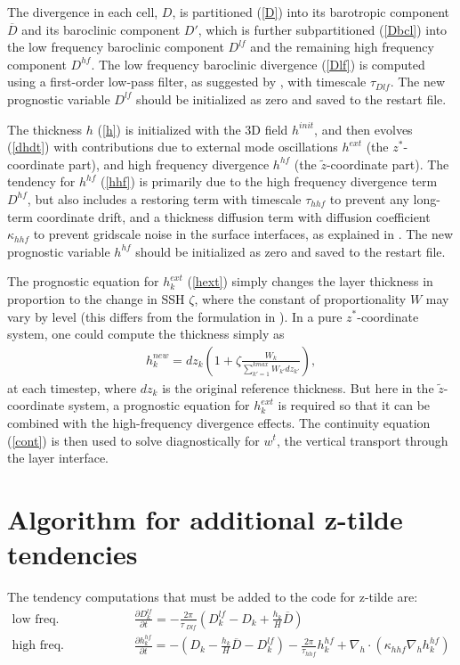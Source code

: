 \documentclass[11pt]{report}
\newcommand{\bea}{\begin{eqnarray}}
\newcommand{\eea}{\end{eqnarray}}
\begin{document}
The divergence in each cell, $D$, is partitioned (\ref{D}) into its barotropic component ${\overline D}$ and its baroclinic component $D'$, which is further subpartitioned (\ref{Dbcl}) into the low frequency baroclinic component $D^{lf}$ and the remaining high frequency component $D^{hf}$.  The low frequency baroclinic divergence (\ref{Dlf}) is computed using a first-order low-pass filter, as suggested by \citep{Leclair_Madec11om}, with timescale $\tau_{Dlf}$.  The new prognostic variable $D^{lf}$ should be initialized as zero and saved to the restart file.

The thickness $h$ (\ref{h}) is initialized with the 3D field $h^{init}$, and then evolves (\ref{dhdt}) with contributions due to external mode oscillations $h^{ext}$ (the $z^*$-coordinate part), and high frequency divergence $h^{hf}$ (the ${\tilde z}$-coordinate part).  The tendency for $h^{hf}$ (\ref{hhf}) is primarily due to the high frequency divergence term $D^{hf}$, but also includes a restoring term with timescale $\tau_{hhf}$ to prevent any long-term coordinate drift, and a thickness diffusion term with diffusion coefficient $\kappa_{hhf}$ to prevent gridscale noise in the surface interfaces, as explained in \citet{Leclair_Madec11om}.  The new prognostic variable $h^{hf}$ should be initialized as zero and saved to the restart file.

The prognostic equation for $h^{ext}_k$ (\ref{hext}) simply changes the layer thickness in proportion to the change in SSH $\zeta$, where the constant of proportionality $W$ may vary by level (this differs from the formulation in \citet{Leclair_Madec11om}).  In a pure $z^*$-coordinate system, one could compute the thickness simply as
\bea
   h_k^{new} = dz_k\left( 1+ \zeta \frac{W_k}{\sum_{k'=1}^{kmax}W_{k'}{dz}_{k'}}\right),
\eea
at each timestep, where $dz_k$ is the original reference thickness.  But here in the ${\tilde z}$-coordinate system, a prognostic equation for $h^{ext}_k$ is required so that it can be combined with the high-frequency divergence effects.
The continuity equation (\ref{cont}) is then used to solve diagnostically for $w^t$, the vertical transport through the layer interface.

\section{Algorithm for additional z-tilde tendencies \label{s tend alg}}

The tendency computations that must be added to the code for z-tilde are:
\bea 
\mbox{low freq. baroclinic div.} && 
  \frac{\partial D^{lf}_k}{\partial t} 
= - \frac{2\pi}{\tau_{\;Dlf}} \left( D^{lf}_k - D_k + \frac{h_k}{H}{\overline D} \right) \label{Dlf2}\\
\mbox{high freq. thickness tend.} && 
  \frac{\partial h^{hf}_k}{\partial t} = - (D_k-{\frac{h_k}{H}\overline D}-D^{lf}_k) - \frac{2\pi}{\tau_{hhf}} h^{hf}_k 
   + \nabla_h\cdot \left( \kappa_{hhf} \nabla_h h^{hf}_k \right)
   \label{hhf2} 
\eea
\end{document}
